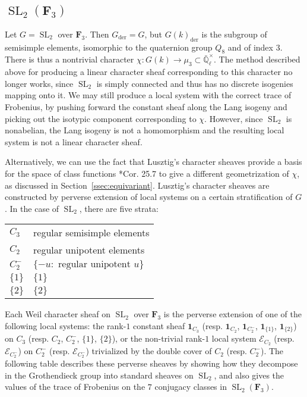 \documentclass[10pt]{amsart}
\theoremstyle{plain}
\theoremstyle{definition}
\newcommand{\FFF}{{\mathbf{F}_3}}
\newcommand{\EE}{\mathbb{\bar Q}_\ell}
\newcommand{\EEx}{\EE^\times}
\DeclareMathOperator{\SL}{SL}
\newcommand{\der}{_{\operatorname{der}}}
\newcommand{\cs}[1]{{\mathcal{#1}}}
\begin{document}
\subsection{\texorpdfstring{$\SL_2(\FFF)$}{\SL(2, 3)}}\label{ssec:SL23}

Let $G = \SL_2$ over $\FFF$.  Then $G\der = G$, but $G(k)\der$ is the subgroup of semisimple elements, isomorphic to the quaternion group $Q_8$ and of index $3$.  There is thus a nontrivial character $\chi : G(k) \to \mu_3 \subset \EEx$.  The method described above for producing a linear character sheaf corresponding to this character no longer works, since $\SL_2$ is simply connected and thus has no discrete isogenies mapping onto it.  We may still produce a local system with the correct trace of Frobenius, by pushing forward the constant sheaf along the Lang isogeny and picking out the isotypic component corresponding to $\chi$.  However, since $\SL_2$ is nonabelian, the Lang isogeny is not a homomorphism and the resulting local system is not a linear character sheaf.

Alternatively, we can use the fact that Lusztig's character sheaves provide a basis for the space of class functions \cite{lusztig:86a}*{Cor. 25.7} to give a different geometrization of $\chi$, as discussed in Section~\ref{ssec:equivariant}.  Lusztig's character sheaves are constructed by perverse extension of local systems on a certain stratification of $G$.  In the case of $\SL_2$, there are five strata:

\vspace{0.1in}

\begin{center}
\begin{spacing}{1.3}
\begin{tabular}{|l|l|}
\hline
$C_3$ & regular semisimple elements \\
$C_2$ & regular unipotent elements \\
$C_2^-$ & $\{-u : \mbox{ regular unipotent $u$}\}$ \\
$\{1\}$ & $\{1\}$ \\
$\{2\}$ & $\{2\}$ \\
\hline
\end{tabular}
\end{spacing}
\end{center}

\vspace{0.1in}

\noindent
Each Weil character sheaf on $\SL_2$ over $\FFF$ is the perverse extension of one of the following local systems: the rank-$1$ constant sheaf $\mathbf{1}_{C_3}$ (resp. $\mathbf{1}_{C_2}$, $\mathbf{1}_{C_2^-}$, $\mathbf{1}_{\{1\}}$,  $\mathbf{1}_{\{2\}}$) on $C_3$ (resp. $C_2$, $C_2^-$, $\{1\}$, $\{2\}$), or the non-trivial rank-$1$ local system $\cs{E}_{C_2}$  (resp.  $\cs{E}_{C_2^-}$) on $C_2^{-}$  (resp.  $\cs{E}_{C_2^-}$) trivialized by the double cover of $C_2$ (resp. $C_2^-$).
The following table describes these perverse sheaves by showing how they decompose in the Grothendieck group into standard sheaves on $\SL_2$, and also gives the values of the trace of Frobenius on the $7$ conjugacy classes in $\SL_2(\FFF)$.
\end{document}

